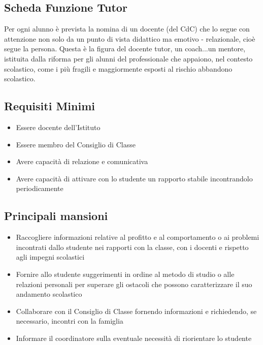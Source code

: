 \documentclass[10pt, a4paper twoside, notitlepage, notoc, justified]{tufte-handout}
\begin{document}
\subsection{\small \bf Scheda Funzione Tutor}

Per ogni alunno è prevista la nomina di un docente (del CdC) che lo segue con attenzione non solo da un punto di vista didattico ma emotivo - relazionale, cioè segue la persona.
Questa è la figura del docente tutor, un coach...un mentore, istituita dalla riforma per gli alunni del professionale che appaiono, nel contesto scolastico, come i più fragili e maggiormente esposti al rischio abbandono scolastico.

\subsection{\small \bf Requisiti Minimi}

		\begin{itemize}
			\item Essere docente dell'Istituto
			\item Essere membro del Consiglio di Classe
			\item Avere capacità di relazione e comunicativa
			\item Avere capacità di attivare con lo studente un rapporto stabile incontrandolo periodicamente
		\end{itemize}
		
\subsection{\small \bf Principali mansioni}
\begin{itemize}
\item	Raccogliere informazioni relative al profitto e al comportamento o ai problemi incontrati dallo studente nei rapporti con la classe, con i docenti e rispetto agli impegni scolastici
\item Fornire allo studente suggerimenti in ordine al metodo di studio o alle relazioni personali per superare gli ostacoli che possono caratterizzare il suo andamento scolastico
\item Collaborare con il Consiglio di Classe fornendo informazioni e richiedendo, se necessario, incontri con la famiglia 
\item Informare il coordinatore sulla eventuale necessità di riorientare lo studente

\end{itemize}
\end{document}
